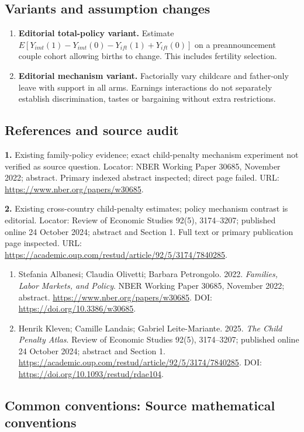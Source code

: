 \documentclass[11pt,a4paper]{article}
\begin{document}
\subsection*{Variants and assumption changes}
\begin{enumerate}
\item \textbf{Editorial total-policy variant.} Estimate \(E[Y_{imt}(1)-Y_{imt}(0)-Y_{ift}(1)+Y_{ift}(0)]\) on a preannouncement couple cohort allowing births to change. This includes fertility selection.
\item \textbf{Editorial mechanism variant.} Factorially vary childcare and father-only leave with support in all arms. Earnings interactions do not separately establish discrimination, tastes or bargaining without extra restrictions.
\end{enumerate}
\subsection*{References and source audit}
\textbf{1.} Existing family-policy evidence; exact child-penalty mechanism experiment not verified as source question. Locator: NBER Working Paper 30685, November 2022; abstract. Primary indexed abstract inspected; direct page failed. URL: \url{https://www.nber.org/papers/w30685}.

\textbf{2.} Existing cross-country child-penalty estimates; policy mechanism contrast is editorial. Locator: Review of Economic Studies 92(5), 3174–3207; published online 24 October 2024; abstract and Section 1. Full text or primary publication page inspected. URL: \url{https://academic.oup.com/restud/article/92/5/3174/7840285}.
\begin{enumerate}\raggedright
\item\hypertarget{definitions:source:30007739:1}{} Stefania Albanesi; Claudia Olivetti; Barbara Petrongolo. 2022. \emph{Families, Labor Markets, and Policy}. NBER Working Paper 30685, November 2022; abstract.
\url{https://www.nber.org/papers/w30685}.
DOI: \url{https://doi.org/10.3386/w30685}.
\item\hypertarget{definitions:source:30007739:2}{} Henrik Kleven; Camille Landais; Gabriel Leite-Mariante. 2025. \emph{The Child Penalty Atlas}. Review of Economic Studies 92(5), 3174–3207; published online 24 October 2024; abstract and Section 1.
\url{https://academic.oup.com/restud/article/92/5/3174/7840285}.
DOI: \url{https://doi.org/10.1093/restud/rdae104}.
\end{enumerate}

\subsection*{Common conventions: Source mathematical conventions}
\end{document}
